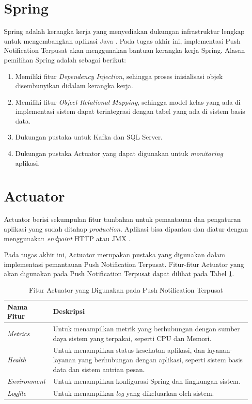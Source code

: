 \section{Spring}
\par Spring adalah kerangka kerja yang menyediakan dukungan infrastruktur lengkap untuk mengembangkan aplikasi Java \cite{spring-online}. Pada tugas akhir ini, implementasi Push Notification Terpusat akan menggunakan bantuan kerangka kerja Spring. Alasan pemilihan Spring adalah sebagai berikut:
\begin{enumerate}
	\item Memiliki fitur \textit{Dependency Injection}, sehingga proses inisialisasi objek disembunyikan didalam kerangka kerja.
	\item Memiliki fitur \textit{Object Relational Mapping}, sehingga model kelas yang ada di implementasi sistem dapat terintegrasi dengan tabel yang ada di sistem basis data.
	\item Dukungan pustaka untuk Kafka dan SQL Server.
	\item Dukungan pustaka Actuator yang dapat digunakan untuk \textit{monitoring} aplikasi.
\end{enumerate}

\section{Actuator}
\par Actuator berisi sekumpulan fitur tambahan untuk pemantauan dan pengaturan aplikasi yang sudah ditahap \textit{production}. Aplikasi bisa dipantau dan diatur dengan menggunakan \textit{endpoint} HTTP atau JMX \cite{actuator-online}.
\par Pada tugas akhir ini, Actuator merupakan pustaka yang digunakan dalam implementasi pemantauan Push Notification Terpusat. Fitur-fitur Actuator yang akan digunakan pada Push Notification Terpusat dapat dilihat pada Tabel \ref{t:fitur-actuator}.
\begin{longtable}{|p{2cm}|p{6cm}|}
	\caption{Fitur Actuator yang Digunakan pada Push Notification Terpusat} \label{t:fitur-actuator} \\ \hline
 	\rowcolor{lightgray} Nama Fitur & Deskripsi \\ \hline
	\textit{Metrics} & Untuk menampilkan metrik yang berhubungan dengan sumber daya sistem yang terpakai, seperti CPU dan Memori. \\ \hline
	\textit{Health} & Untuk menampilkan status kesehatan aplikasi, dan layanan-layanan yang berhubungan dengan aplikasi, seperti sistem basis data dan sistem antrian pesan. \\ \hline
	\textit{Environment} & Untuk menampilkan konfigurasi Spring dan lingkungan sistem. \\ \hline
	\textit{Logfile} & Untuk menampilkan \textit{log} yang dikeluarkan oleh sistem. \\ \hline
\end{longtable}

